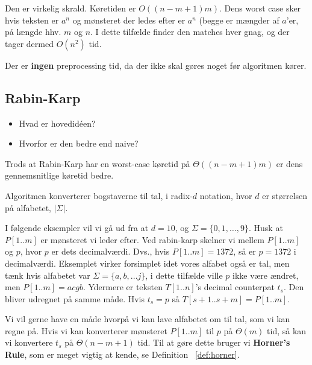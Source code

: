 \documentclass[11pt]{article}
\theoremstyle{definition}
\theoremstyle{remark}
\begin{document}
Den er virkelig skrald. Køretiden er $O((n-m+1)m)$. Dens worst case sker hvis teksten er $a^{n}$ og mønsteret der ledes efter er $a^{n}$ (begge er mængder af $a$'er, på længde hhv. $m$ og $n$. I dette tilfælde finder den matches hver gnag, og der tager dermed $O(n^{2})$ tid.

Der er \textbf{ingen} preprocessing tid, da der ikke skal gøres noget før algoritmen kører.



\subsection{Rabin-Karp}
\label{subsec:rabinkarp}

\begin{itemize}
\item Hvad er hovedidéen? 
\item Hvorfor er den bedre end naive? 
\end{itemize}

Trods at Rabin-Karp har en worst-case køretid på $\Theta((n-m+1)m)$ er dens gennemsnitlige køretid bedre.

Algoritmen konverterer bogstaverne til tal, i radix-$d$ notation, hvor $d$ er størrelsen på alfabetet, $|\Sigma|$.

I følgende eksempler vil vi gå ud fra at $d = 10$, og $\Sigma = \{0, 1, \ldots, 9\}$. Husk at $P[1..m]$ er mønsteret vi leder efter. Ved rabin-karp skelner vi mellem $P[1..m]$ og $p$, hvor $p$ er dets decimalværdi. Dvs., hvis $P[1..m] = 1372$, så er $p = 1372$ i decimalværdi. Eksemplet virker forsimplet idet vores alfabet også er tal, men tænk hvis alfabetet var $\Sigma = \{a, b, ... j\}$, i dette tilfælde ville $p$ ikke være ændret, men $P[1..m] = acgb$. Ydermere er teksten $T[1..n]$'s decimal counterpat $t_{s}$. Den bliver udregnet på samme måde. Hvis $t_{s} = p$ så $T[s+1..s+m] = P[1..m]$.

Vi vil gerne have en måde hvorpå vi kan lave alfabetet om til tal, som vi kan regne på. Hvis vi kan konverterer mønsteret $P[1..m]$ til $p$ på $\Theta(m)$ tid, så kan vi konvertere $t_{s}$ på $\Theta(n-m+1)$ tid. Til at gøre dette bruger vi \textbf{Horner's Rule}, som er meget vigtig at kende, se Definition ~\ref{def:horner}.
\end{document}
